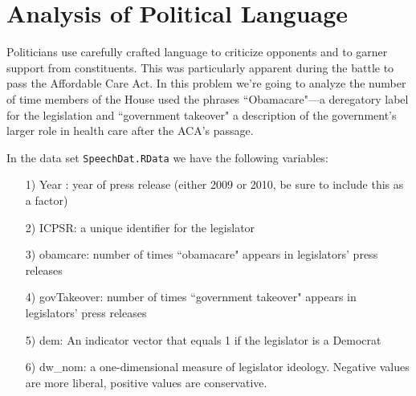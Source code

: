\documentclass[letterpaper,12pt]{article}
\numberwithin{equation}{section}
\numberwithin{equation}{section}
\begin{document}
\section{Analysis of Political Language}
Politicians use carefully crafted language to criticize opponents and to garner support from constituents.  This was particularly apparent during the battle to pass the Affordable Care Act.  In this problem we're going to analyze the number of time members of the House used the phrases ``Obamacare"---a deregatory label for the legislation and ``government takeover" a description of the government's larger role in health care after the ACA's passage.


In the data set {\tt SpeechDat.RData} we have the following variables:
\begin{itemize}
\item[1)] Year : year of press release (either 2009 or 2010, be sure to include this as a factor)
\item[2)] ICPSR: a unique identifier for the legislator
\item[3)] obamcare: number of times ``obamacare" appears in legislators' press releases
\item[4)] govTakeover: number of times ``government takeover" appears in legislators' press releases
\item[5)] dem: An indicator vector that equals 1 if the legislator is a Democrat
\item[6)] dw\_nom: a one-dimensional measure of legislator ideology.  Negative values are more liberal, positive values are conservative.
\end{itemize}
\end{document}
